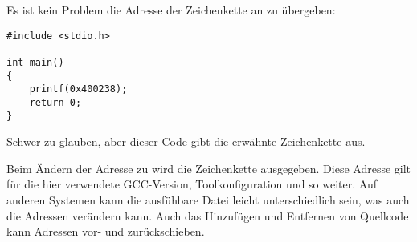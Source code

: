 Es ist kein Problem die Adresse der Zeichenkette 
an  zu übergeben:

\begin{lstlisting}
#include <stdio.h>

int main()
{
    printf(0x400238);
    return 0;
}
\end{lstlisting}

Schwer zu glauben, aber dieser Code gibt die erwähnte Zeichenkette aus.

Beim Ändern der Adresse zu  wird die Zeichenkette  ausgegeben.
Diese Adresse gilt für die hier verwendete GCC-Version, Toolkonfiguration und so weiter.
Auf anderen Systemen kann die ausfühbare Datei leicht unterschiedlich sein, was auch
die Adressen verändern kann.
Auch das Hinzufügen und Entfernen von Quellcode kann Adressen vor- und zurückschieben.
